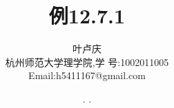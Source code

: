 \documentclass[a4paper, 12pt]{article} %
\makeatletter
\renewcommand{\maketitle}{ %
  \renewcommand\refname{参考文献}
  \newcommand{\D}{\displaystyle}\newcommand{\ri}{\Rightarrow}
  \newcommand{\ds}{\displaystyle} \renewcommand{\ni}{\noindent}
  \newcommand{\pa}{\partial} \newcommand{\Om}{\Omega}
  \newcommand{\om}{\omega} \newcommand{\sik}{\sum_{i=1}^k}
  \newcommand{\vov}{\Vert\omega\Vert} \newcommand{\Umy}{U_{\mu_i,y^i}}
  \newcommand{\lamns}{\lambda_n^{^{\scriptstyle\sigma}}}
  \newcommand{\chiomn}{\chi_{_{\Omega_n}}}
  \newcommand{\ullim}{\underline{\lim}} \newcommand{\bsy}{\boldsymbol}
  \newcommand{\mvb}{\mathversion{bold}} \newcommand{\la}{\lambda}
  \newcommand{\La}{\Lambda} \newcommand{\va}{\varepsilon}
  \newcommand{\be}{\beta} \newcommand{\al}{\alpha}
  \newcommand{\dis}{\displaystyle} \newcommand{\R}{{\mathbb R}}
  \newcommand{\N}{{\mathbb N}} \newcommand{\cF}{{\mathcal F}}
  \newcommand{\gB}{{\mathfrak B}} \newcommand{\eps}{\epsilon}
  \begin{flushright} %
    {\LARGE\@title} %
    
    \vspace{50pt} %
    
    {\large\@author} %
    \\\@date %
    
    \vspace{40pt} %
  \end{flushright}
}
\makeatother
\begin{document}
\begin{CJK}{UTF8}{gkai}
  \title{\textbf{例12.7.1}}
  \author{\small{叶卢庆}\\{\small{杭州师范大学理学院,学
        号:1002011005}}\\{\small{Email:h5411167@gmail.com}}} %
  \renewcommand{\today}{\number\year. \number\month. \number\day}
  \date{\today} %
  
  
  
  \maketitle %
  
  
  
  
  
  
  

\end{CJK}
\end{document}
